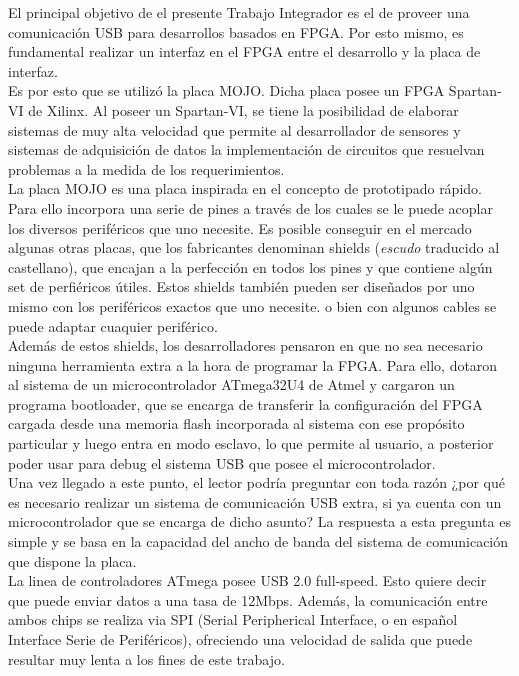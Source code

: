 El principal objetivo de el presente Trabajo Integrador es el de proveer una comunicación USB para desarrollos basados en FPGA. Por esto mismo, es fundamental realizar un interfaz en el FPGA entre el desarrollo y la placa de interfaz.\\

Es por esto que se utilizó la placa MOJO. Dicha placa posee un FPGA Spartan-VI de Xilinx. Al poseer un Spartan-VI, se tiene la posibilidad de elaborar sistemas de muy alta velocidad que permite al desarrollador de sensores y sistemas de adquisición de datos la implementación de circuitos que resuelvan problemas a la medida de los requerimientos.\\

La placa MOJO es una placa inspirada en el concepto de prototipado rápido. Para ello incorpora una serie de pines a través de los cuales se le puede acoplar los diversos periféricos que uno necesite. Es posible conseguir en el mercado algunas otras placas, que los fabricantes denominan shields ({\it escudo} traducido al castellano), que encajan a la perfección en todos los pines y que contiene algún set de perfiéricos útiles. Estos shields también pueden ser diseñados por uno mismo con los periféricos exactos que uno necesite. o bien con algunos cables se puede adaptar cuaquier periférico.\\

Además de estos shields, los desarrolladores pensaron en que no sea necesario ninguna herramienta extra a la hora de programar la FPGA. Para ello, dotaron al sistema de un microcontrolador ATmega32U4 de Atmel y cargaron un programa bootloader, que se encarga de transferir la configuración del FPGA cargada desde una memoria flash incorporada al sistema con ese propósito particular y luego entra en modo esclavo, lo que permite al usuario, a posterior poder usar para debug el sistema USB que posee el microcontrolador.\\

Una vez llegado a este punto, el lector podría preguntar con toda razón ¿por qué es necesario realizar un sistema de comunicación USB extra, si ya cuenta con un microcontrolador que se encarga de dicho asunto? La respuesta a esta pregunta es simple y se basa en la capacidad del ancho de banda del sistema de comunicación que dispone la placa.\\

La linea de controladores ATmega posee USB 2.0 full-speed. Esto quiere decir que puede enviar datos a una tasa de 12Mbps. Además, la comunicación entre ambos chips se realiza via SPI (Serial Peripherical Interface, o en español Interface Serie de Periféricos), ofreciendo una velocidad de salida que puede resultar muy lenta a los fines de este trabajo. 